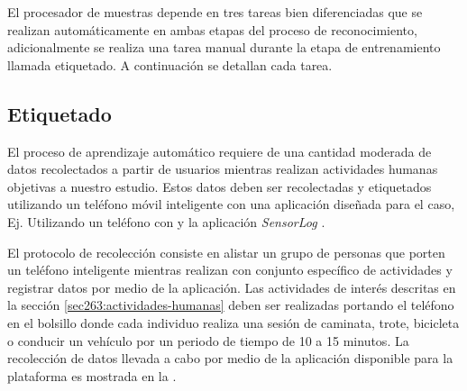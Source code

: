 El procesador de muestras depende en tres tareas bien diferenciadas
que se realizan automáticamente en ambas etapas del proceso de reconocimiento,
adicionalmente se realiza una tarea manual durante la etapa de entrenamiento
llamada etiquetado. A continuación se detallan cada tarea.

\subsection{Etiquetado}

\label{ssec44:labeling}El proceso de aprendizaje automático requiere
de una cantidad moderada de datos recolectados a partir de usuarios
mientras realizan actividades humanas objetivas a nuestro estudio.
Estos datos deben ser recolectadas y etiquetados utilizando un teléfono
móvil inteligente con una aplicación diseñada para el caso, Ej. Utilizando
un teléfono con  y la aplicación \emph{SensorLog} \cite{SLog2016}. 

El protocolo de recolección consiste en alistar un grupo de personas
que porten un teléfono inteligente mientras realizan con conjunto
específico de actividades y registrar datos por medio de la aplicación.
Las actividades de interés descritas en la sección \ref{sec263:actividades-humanas}
deben ser realizadas portando el teléfono en el bolsillo donde cada
individuo realiza una sesión de caminata, trote, bicicleta o conducir
un vehículo por un periodo de tiempo de 10 a 15 minutos. La recolección
de datos llevada a cabo por medio de la aplicación disponible para
la plataforma  es mostrada en la . 


